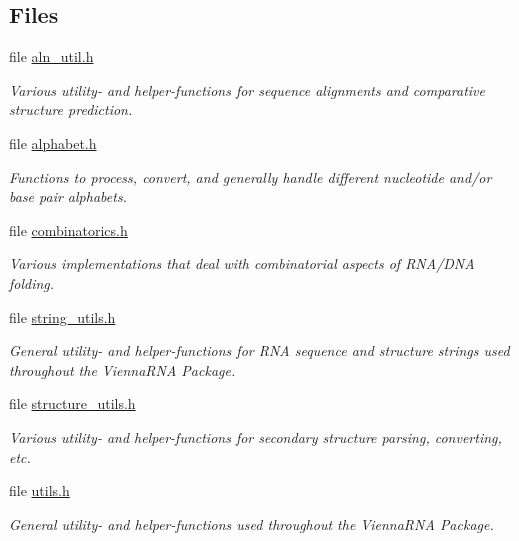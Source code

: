 \subsection*{Files}
\begin{DoxyCompactItemize}
\item 
file \hyperlink{aln__util_8h}{aln\+\_\+util.\+h}
\begin{DoxyCompactList}\small\item\em Various utility-\/ and helper-\/functions for sequence alignments and comparative structure prediction. \end{DoxyCompactList}\item 
file \hyperlink{alphabet_8h}{alphabet.\+h}
\begin{DoxyCompactList}\small\item\em Functions to process, convert, and generally handle different nucleotide and/or base pair alphabets. \end{DoxyCompactList}\item 
file \hyperlink{combinatorics_8h}{combinatorics.\+h}
\begin{DoxyCompactList}\small\item\em Various implementations that deal with combinatorial aspects of R\+N\+A/\+D\+NA folding. \end{DoxyCompactList}\item 
file \hyperlink{string__utils_8h}{string\+\_\+utils.\+h}
\begin{DoxyCompactList}\small\item\em General utility-\/ and helper-\/functions for R\+NA sequence and structure strings used throughout the Vienna\+R\+NA Package. \end{DoxyCompactList}\item 
file \hyperlink{structure__utils_8h}{structure\+\_\+utils.\+h}
\begin{DoxyCompactList}\small\item\em Various utility-\/ and helper-\/functions for secondary structure parsing, converting, etc. \end{DoxyCompactList}\item 
file \hyperlink{utils_8h}{utils.\+h}
\begin{DoxyCompactList}\small\item\em General utility-\/ and helper-\/functions used throughout the {\itshape Vienna\+R\+NA} {\itshape Package}. \end{DoxyCompactList}\end{DoxyCompactItemize}
